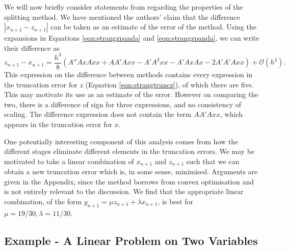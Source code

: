 We will now briefly consider statements from \cite{blanes_pos_2022} regarding the properties of the splitting method.
We have mentioned the authors' claim that the difference $|x_{n+1} - z_{n+1}|$ can be taken as an estimate of the error of the method.
Using the expansions in Equations \ref{eqn:strangzpanda} and \ref{eqn:strangzpanda}, we can write their difference as
\begin{equation}
    z_{n+1} - x_{n+1} = \frac{h^3}{8} \left(
        A'' Ax Ax x + A A' A xx - A' A^2 xx - A' Ax Ax - 2 A' A' A xx
    \right) + \mathcal{O}(h^4).
    \label{eqn:strangdiff}
\end{equation}
This expression on the difference between methods contains every expression in the truncation error for $z$ (Equation \ref{eqn:strangtruncz}), of which there are five.
This may motivate its use as an estimate of the error.
However on comparing the two, there is a difference of sign for three expressions, and no consistency of scaling.
The difference expression does not contain the term $AA'Axx$, which appears in the truncation error for $x$.

One potentially interesting component of this analysis comes from how the different stages eliminate different elements in the truncation errors.
We may be motivated to take a linear combination of $x_{n+1}$ and $z_{n+1}$ such that we can obtain a new truncation error which is, in some sense, minimised.
Arguments are given in the Appendix, since the method borrows from convex optimisation \cite{boyd2004convex} and is not entirely relevant to the discussion.
We find that the appropriate linear combination, of the form $y_{n+1} = \mu z_{n+1} + \lambda x_{n+1}$,
is best for $\mu = 19/30, \lambda = 11/30$.


\subsection{Example - A Linear Problem on Two Variables}

